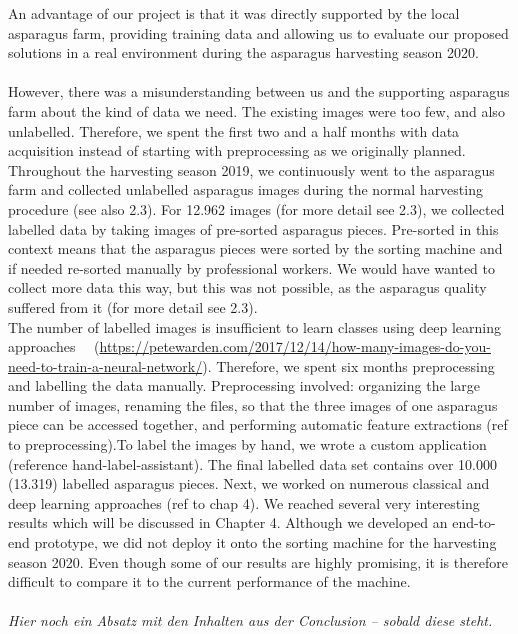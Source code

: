 An advantage of our project is that it was directly supported by the local asparagus farm, providing training data and allowing us to evaluate our proposed solutions in a real environment during the asparagus harvesting season 2020. \\
\\
However, there was a misunderstanding between us and the supporting asparagus farm about the kind of data we need. The existing images were too few, and also unlabelled. Therefore, we spent the first two and a half months with data acquisition instead of starting with preprocessing as we originally planned. Throughout the harvesting season 2019, we continuously went to the asparagus farm and collected unlabelled asparagus images during the normal harvesting procedure (see also 2.3). For 12.962 images (for more detail see 2.3), we collected labelled data by taking images of pre-sorted asparagus pieces. Pre-sorted in this context means that the asparagus pieces were sorted by the sorting machine and if needed re-sorted manually by professional workers. We would have wanted to collect more data this way, but this was not possible, as the asparagus quality suffered from it (for more detail see 2.3). \\
The number of labelled images is insufficient to learn classes using deep learning approaches~\citep{russakovsky2013detecting}~\citep{russakovsky2010attribute} (\url{https://petewarden.com/2017/12/14/how-many-images-do-you-need-to-train-a-neural-network/}). Therefore, we spent six months preprocessing and labelling the data manually. Preprocessing involved: organizing the large number of images, renaming the files, so that the three images of one asparagus piece can be accessed together, and performing automatic feature extractions (ref to preprocessing).To label the images by hand, we wrote a custom application (reference hand-label-assistant). The final labelled data set contains over 10.000 (13.319) labelled asparagus pieces. Next, we worked on numerous classical and deep learning approaches (ref to chap 4). We reached several very interesting results which will be discussed in Chapter 4. Although we developed an end-to-end prototype, we did not deploy it onto the sorting machine for the harvesting season 2020. Even though some of our results are highly promising, it is therefore difficult to compare it to the current performance of the machine. \\
 \\
\textit{Hier noch ein Absatz mit den Inhalten aus der Conclusion – sobald diese steht.} 

